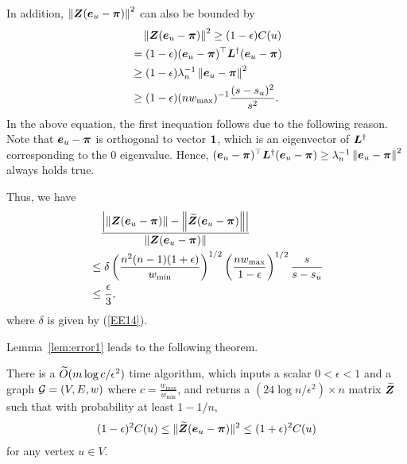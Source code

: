 \documentclass[10pt,journal,compsoc,twocolumn,twoside]{IEEEtran}
\begin{document}
\begin{IEEEproof}
    In addition, \(\left\Vert\boldsymbol{Z} (\boldsymbol{e}_u - \boldsymbol{\pi})\right\Vert^2\) can also be bounded by
    \begin{equation}\label{EE17}
        \begin{split}  \notag
            &\quad\left\Vert\boldsymbol{Z} (\boldsymbol{e}_u - \boldsymbol{\pi})\right\Vert^2
            \geq
            (1 - \epsilon) C(u) \\
            &=(1-\epsilon)(\boldsymbol{e}_u-\boldsymbol{\pi})^{\top} \boldsymbol{L}^{\dagger} (\boldsymbol{e}_u-\boldsymbol{\pi}) \\
            &\geq (1-\epsilon)\lambda_{n}^{-1} \left\Vert\boldsymbol{e}_u-\boldsymbol{\pi}\right\Vert^2 \\
            &	\geq (1-\epsilon)(n w_{\max})^{-1} \frac{(s-s_u)^2}{s^2}.
        \end{split}
    \end{equation}
    In the above equation, the first inequation follows due to the following reason.   Note that \(\boldsymbol{e}_u-\boldsymbol{\pi}\) is orthogonal to  vector \(\boldsymbol{1}\), which is an eigenvector of \(\boldsymbol{L}^{\dagger}\) corresponding to the \(0\) eigenvalue. Hence, \((\boldsymbol{e}_u-\boldsymbol{\pi})^{\top} \boldsymbol{L}^{\dagger} (\boldsymbol{e}_u-\boldsymbol{\pi}) \ge \lambda_{n}^{-1} \left\Vert\boldsymbol{e}_u-\boldsymbol{\pi}\right\Vert^2\) always holds true.

    Thus, we have
    \begin{align*}
         & \quad \frac{
            \left| \left\Vert\boldsymbol{Z} (\boldsymbol{e}_{u} - \boldsymbol{\pi})\right\Vert -  \left\Vert\widetilde{\boldsymbol{Z}}  (\boldsymbol{e}_{u} - \boldsymbol{\pi})\right\Vert \right|
        }{
            \left\Vert\boldsymbol{Z} (\boldsymbol{e}_{u} - \boldsymbol{\pi})\right\Vert
        }                                                 \\
         & \le
        \delta \left(\frac{n^2(n-1) (1+\epsilon)}{w_{\min}}\right)^{1/2}\left(\frac{n
        w_{\max}}{1-\epsilon}\right)^{1/2}\frac{s}{s-s_u} \\
         & \le \frac{\epsilon}{3},
    \end{align*}
    where \(\delta\) is given by (\ref{EE14}).
\end{IEEEproof}

Lemma~\ref{lem:error1} leads to the following theorem.
\begin{theorem}
    \label{TheoAlg1}
    There is a \(\widetilde{O}(m\log{c}/\epsilon^2)\) time algorithm, which  inputs  a scalar \(0<\epsilon<1\) and a graph \(\mathcal{G}=(V,E,w)\) where \(c=\frac{w_{\max}}{w_{\min}}\), and returns a \((24\log n/\epsilon^2)\times n\) matrix \(\widetilde{\boldsymbol{Z}}\) such that with probability at least \(1-1/n\),
    \begin{align}
        (1-\epsilon)^2  C(u) \leq \|\widetilde{\boldsymbol{Z}}(\boldsymbol{e}_u-\boldsymbol{\pi})\|^2 \leq (1+\epsilon)^2  C(u)\nonumber
    \end{align}
    for any vertex \(u \in V\).
\end{theorem}
\end{document}
